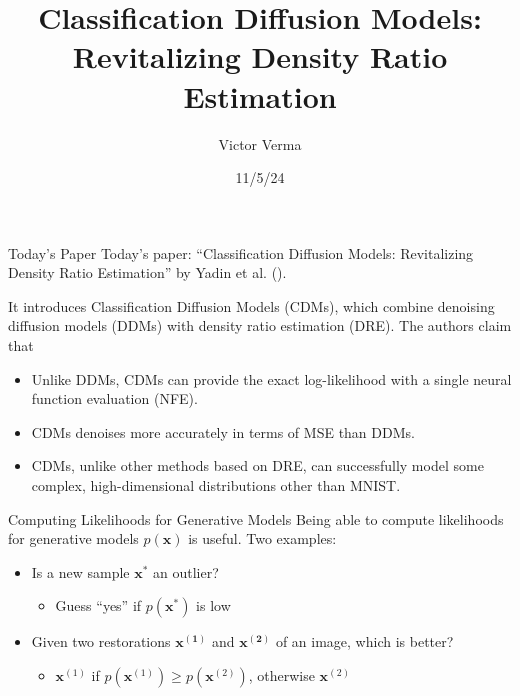 \documentclass{beamer}
\title[Classification Diffusion Models]{Classification Diffusion Models: \\ Revitalizing Density Ratio Estimation}
\author{Victor Verma}
\institute[]
{
Department of Statistics \\
University of Michigan
}
\date[11/5/24]{11/5/24}
\begin{document}
\begin{frame}
    \titlepage
\end{frame}

\begin{frame}{Today's Paper}
    Today's paper: ``Classification Diffusion Models: Revitalizing Density Ratio Estimation''  by Yadin et al. (\cite{yadin2024clas}).

    \medskip

    It introduces Classification Diffusion Models (CDMs), which combine denoising diffusion models (DDMs) with density ratio estimation (DRE). The authors claim that
    \begin{itemize}
        \item Unlike DDMs, CDMs can provide the exact log-likelihood with a single neural function evaluation (NFE).
        \item CDMs denoises more accurately in terms of MSE than DDMs.
        \item CDMs, unlike other methods based on DRE, can successfully model some complex, high-dimensional distributions other than MNIST.
    \end{itemize}
\end{frame}

\begin{frame}{Computing Likelihoods for Generative Models}
    Being able to compute likelihoods for generative models $p(\mathbf{x})$ is useful. Two examples:
    \begin{itemize}
        \item Is a new sample $\mathbf{x^*}$ an outlier?
        \begin{itemize}
            \item Guess ``yes'' if $p(\mathbf{x^*})$ is low
        \end{itemize}
        \item Given two restorations $\mathbf{x^{(1)}}$ and $\mathbf{x^{(2)}}$ of an image, which is better?
        \begin{itemize}
            \item $\mathbf{x}^{(1)}$ if $p(\mathbf{x}^{(1)}) \ge p(\mathbf{x}^{(2)})$, otherwise $\mathbf{x}^{(2)}$
        \end{itemize}
    \end{itemize}
\end{frame}
    
\end{document}
